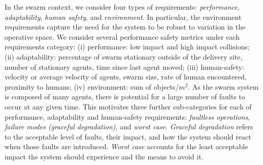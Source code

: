 \documentclass[runningheads]{llncs}
\begin{document}
In the swarm context, we consider four types of requirements: \emph{performance}, \emph{adaptability}, \emph{human safety}, and \emph{environment}.
In particular, the environment requirements capture the need for the system to be robust to variation in the operative space.
We consider several performance safety metrics under each requirements category: 
(i) performance: low impact and high impact collisions; 
(ii) adaptability: percentage of swarm stationary outside of the delivery site, number of stationary agents, time since last agent moved; 
(iii) human-safety: velocity or average velocity of agents, swarm size, rate of human encountered, proximity to humans;
(iv) environment: sum of objects/$m^2$.
As the swarm system is composed of many agents, there is potential for a large number of faults to occur at any given time. This motivates three further sub-categories for each of performance, adaptability and human-safety requirements: \emph{faultless operations}, \emph{failure modes (graceful degradation)}, and \emph{worst case}. 
\emph{Graceful degradation} refers to the acceptable level of faults, their impact, and how the system should react when those faults are introduced. \emph{Worst case} accounts for the least acceptable impact the system should experience and the means to avoid it. 

\vspace{-2ex}
\end{document}
